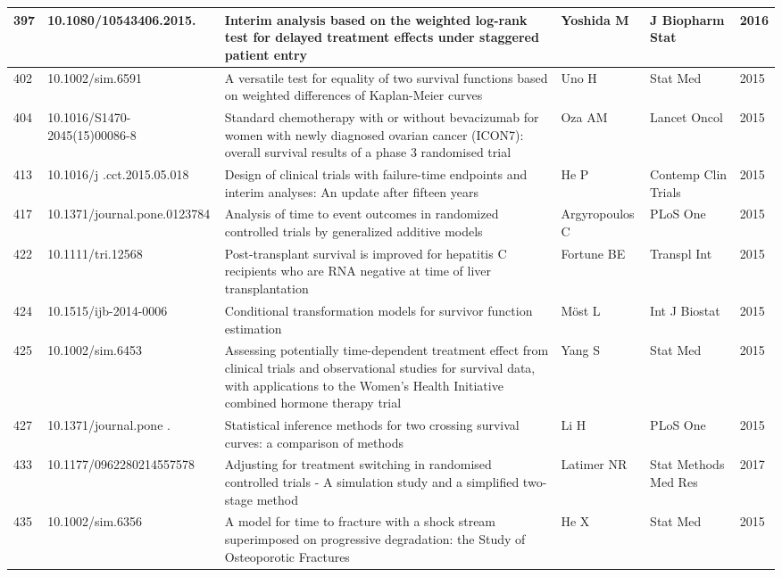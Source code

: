 \begin{landscape}
\begin{longtable}{|p{0.3in}|p{1.8in}|p{2.4in}|p{0.68in}|p{0.89in}|p{0.3in}|}
397 & 10.1080/10543406.2015.\-1094809  & Interim analysis based on the weighted log-rank test for delayed treatment effects under staggered patient entry & Yoshida M & J Biopharm Stat & 2016 \\ \hline 
402 & 10.1002/sim.6591        & A versatile test for equality of two survival functions based on weighted differences of Kaplan-Meier curves & Uno H & Stat Med & 2015 \\ \hline 
404 & 10.1016/S1470-2045(15)00086-8 & Standard chemotherapy with or without bevacizumab for women with newly diagnosed ovarian cancer (ICON7): overall survival results of a phase 3 randomised trial & Oza AM & Lancet Oncol & 2015 \\ \hline 
413 & 10.1016/j       .cct.2015.05.018  & Design of clinical trials with failure-time endpoints and interim analyses: An update after fifteen years & He P & Contemp Clin Trials & 2015 \\ \hline 
417 & 10.1371/journal.\-pone.0123784  & Analysis of time to event outcomes in randomized controlled trials by generalized additive models & Argyro\-poulos C & PLoS One & 2015 \\ \hline 
422 & 10.1111/tri.12568    & Post-transplant survival is improved for hepatitis C recipients who are RNA negative at time of liver transplantation & Fortune BE & Transpl Int & 2015 \\ \hline 
424 & 10.1515/ijb-2014-0006    & Conditional transformation models for survivor function estimation & M\"{o}st L & Int J Biostat & 2015 \\ \hline 
425 & 10.1002/sim.6453  & Assessing potentially time-dependent treatment effect from clinical trials and observational studies for survival data, with applications to the Women's Health Initiative combined hormone therapy trial & Yang S & Stat Med & 2015 \\ \hline 
427 & 10.1371/journal.pone .\-0116774  & Statistical inference methods for two crossing survival curves: a comparison of methods & Li H & PLoS One & 2015 \\ \hline 
433 & 10.1177/0962280214557578        & Adjusting for treatment switching in randomised controlled trials - A simulation study and a simplified two-stage method & Latimer NR & Stat Methods Med Res & 2017 \\ \hline 
435 & 10.1002/sim.6356        & A model for time to fracture with a shock stream superimposed on progressive degradation: the Study of Osteoporotic Fractures & He X & Stat Med & 2015 \\ \hline 

\end{longtable}
\end{landscape}

